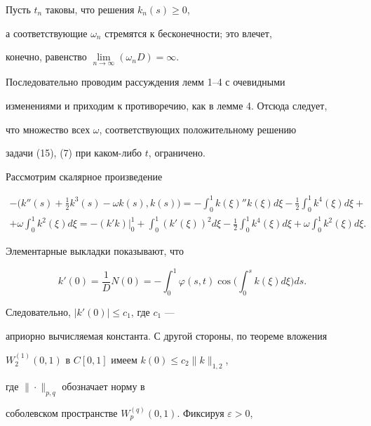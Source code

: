 \begin{pf}


Пусть $t_n$ таковы, что решения $k_n(s) \ge 0$,


а соответствующие $\omega_n$ стремятся к бесконечности; это влечет,


конечно, равенство $\lim\limits_{n\to \infty}(\omega_nD)=\infty$.


Последовательно проводим рассуждения лемм 1--4 с очевидными


изменениями и приходим к противоречию, как в лемме 4. Отсюда следует,


что множество всех $\omega $, соответствующих положительному решению


задачи (15), (7) при каком-либо $t$, ограничено.





Рассмотрим скалярное произведение


\begin{multline}


-\big({k}''(s) + \tfrac{1}{2}k^3 (s)-\omega k(s),k(s)\big)


=-\int_{0}^{1} {} {k(\xi)}''k(\xi) d\xi -


\tfrac{1}{2} \int_{0}^{1} {} k^4(\xi) d\xi + \\


%


+\omega \int_{0}^{1} k^2(\xi) d\xi=-({k}'k)\big|_0^1


+\int_{0}^{1} ({k}'(\xi))^2 d\xi - \tfrac{1}{2}\int_{0}^{1} k^4(\xi) d\xi +


\omega \int_{0}^{1} {} k^2(\xi) d\xi.


\end{multline}


Элементарные выкладки показывают, что


$$


{k}'(0)=\frac{1}{D}N(0)=-\int_0^1\varphi(s,t)\cos\bigg(\int_0^s


k (\xi)d \xi \bigg) ds.


$$


Следовательно, $| {{k}'(0)}| \le c_1$, где $c_1$ ---


априорно вычисляемая константа. С другой стороны, по теореме вложения


$W_2^{(1)}(0,1)$ в $C[0,1]$ имеем $k(0) \le c_2 \| {k}\|_{1,2}$,


где $\| {\cdot}\|_{p,q}$ обозначает норму в


соболевском пространстве $W_p^{(q)}(0,1)$. Фиксируя $\varepsilon >0$,



\end{pf}
